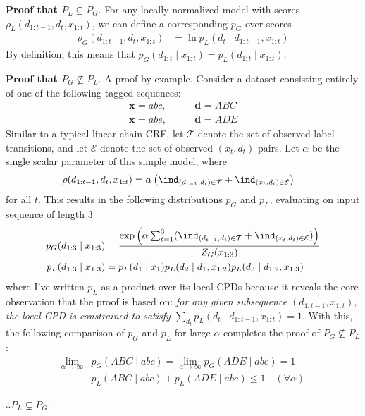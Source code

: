 \documentclass[11pt]{article}
\renewcommand\vec[2][]{\bm{#2}_{#1}}
\begin{document}
\begin{example}
	\textbf{Proof that $P_L \subseteq P_G$}. For any locally normalized model with scores $\rho_L(d_{1:t-1}, d_{t}, x_{1:t})$, we can define a corresponding $p_G$ over scores
	\begin{align}
		\rho_G(d_{1:t-1}, d_t, x_{1:t}) 
			&= \ln p_L(d_t \mid d_{1:t-1}, x_{1:t}) 
	\end{align}
	By definition, this means that $p_G(d_{1:t} \mid x_{1:t}) = p_L(d_{1:t} \mid x_{1:t})$. 
	
	\textbf{Proof that $P_G \nsubseteq P_L$}. A proof by example. Consider a dataset consisting entirely of one of the following tagged sequences:
	\begin{align}
		\vec{x} = abc, &\qquad \vec{d} = ABC \\
		\vec{x} = abe, &\qquad \vec{d} = ADE  
	\end{align}
	Similar to a typical linear-chain CRF, let $\mathcal{T}$ denote the set of observed label transitions, and let $\mathcal{E}$ denote the set of observed $(x_t, d_t)$ pairs. Let $\alpha$ be the single scalar parameter of this simple model, where
	\begin{align}
		\rho(d_{1:t-1}, d_t, x_{1:t})
			&= \alpha \left( \ind_{(d_{t-1}, d_t) \in \mathcal T}
			+ \ind_{(x_t, d_t) \in \mathcal E} \right)
	\end{align}
	for all $t$. This results in the following distributions $p_G$ and $p_L$, evaluating on input sequence of length $3$
	\begin{align}
		p_G(d_{1:3} \mid x_{1:3})
			&= \frac{
				\exp\left( \alpha \sum_{t=1}^{3} ( \ind_{(d_{t-1}, d_t) \in \mathcal T}
				+ \ind_{(x_t, d_t) \in \mathcal E} )  \right)
				}{
				Z_G(x_{1:3})
			} \\
		p_L(d_{1:3} \mid x_{1:3})
			&= p_L(d_1 \mid x_1) p_L(d_2 \mid d_1, x_{1:2})  p_L(d_3 \mid d_{1:2}, x_{1:3})
	\end{align}
	where I've written $p_L$ as a product over its local CPDs because it reveals the core observation that the proof is based on: \textit{for any given subsequence $(d_{1:t-1}, x_{1:t})$, the local CPD is constrained to satisfy $\sum_{d_t} p_L(d_t \mid d_{1:t-1}, x_{1:t}) = 1$}. With this, the following comparison of $p_G$ and $p_L$ for large $\alpha$ completes the proof of $P_G \nsubseteq P_L$:
	\begin{align}
		\lim_{\alpha \rightarrow \infty} &p_G(ABC \mid abc) 
			= \lim_{\alpha \rightarrow \infty} p_G(ADE \mid abe) = 1 \\
		&p_L(ABC \mid abc) + p_L(ADE \mid abe)  \le 1 \quad (\forall \alpha) 
	\end{align}
	
	$\therefore P_L \subsetneq P_G$.
\end{example}
\end{document}
